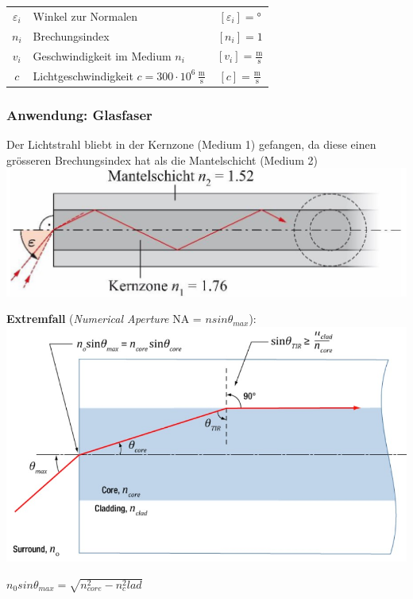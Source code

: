 \begin{tabular}{c l c}
	$\varepsilon_i$ & Winkel zur Normalen & $[\varepsilon_i] =$° \\
	$n_i$ & Brechungsindex & $[n_i] = 1$ \\
	$v_i$ & Geschwindigkeit im Medium $n_i$ & $[v_i] = \mathrm{\frac{m}{s}}$ \\
	$c$ & Lichtgeschwindigkeit $c = 300 \cdot 10^6 \, \mathrm{\frac{m}{s}}$ & $[c] = \mathrm{\frac{m}{s}}$ \\
\end{tabular}

\subsubsection{Anwendung: Glasfaser}

Der Lichtstrahl bliebt in der Kernzone (Medium 1) gefangen, da diese einen grösseren Brechungsindex hat als die Mantelschicht (Medium 2) \\

\includegraphics[width=0.75\linewidth]{Bilder/Wellen-Optik/glasfaser}

\textbf{Extremfall} (\textit{Numerical Aperture} NA = $nsin\theta_{max}$):\\
\includegraphics[width=0.8\linewidth]{Bilder/Wellen-Optik/glasfaser-2.jpg}

\begin{center}
	$ \boxed{n_0sin\theta_{max} = \sqrt{n^2_{core} - n^2_clad}} $ 
\end{center}






